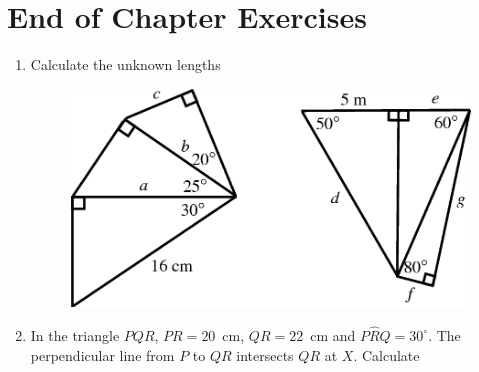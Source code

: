             \section{ End of Chapter Exercises}
            \nopagebreak
      \label{m39414*id92202}\begin{enumerate}[noitemsep, label=\textbf{\arabic*}. ] 
            \label{m39414*uid98}\item Calculate the unknown lengths
    \setcounter{subfigure}{0}
	\begin{figure}[H] %
    \begin{center}
    \label{m39414*id92222!!!underscore!!!media}\label{m39414*id92222!!!underscore!!!printimage}\includegraphics{col11306.imgs/m39414_MG10C15_041.png} %
      \vspace{2pt}
    \vspace{.1in}
    \end{center}
 \end{figure}               \label{m39414*uid99}\item In the triangle \begin{math}PQR\end{math}, \begin{math}PR=20\end{math}~cm, \begin{math}QR=22\end{math}~cm and \begin{math}P\hat{R}Q={30}^{\circ }\end{math}. The perpendicular line from \begin{math}P\end{math} to \begin{math}QR\end{math} intersects \begin{math}QR\end{math} at \begin{math}X\end{math}. Calculate

\end{enumerate}

